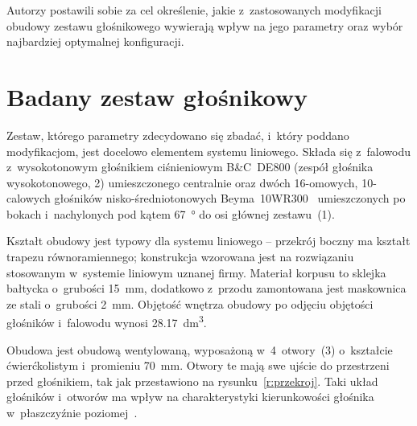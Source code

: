 \documentclass[12pt]{oska}
\newcommand{\comment}[1]{{\color{magenta}\emph{\textbf{#1}}}}
\begin{document}
	Autorzy postawili sobie za cel określenie, jakie z~zastosowanych modyfikacji obudowy zestawu głośnikowego wywierają wpływ na jego parametry oraz wybór najbardziej optymalnej konfiguracji.
	
	
	
	\section{Badany zestaw głośnikowy}\label{ss:opis}
	
	
	Zestaw, którego parametry zdecydowano się zbadać, i~który poddano modyfikacjom, jest docelowo elementem systemu liniowego. Składa się z~falowodu z~wysokotonowym głośnikiem ciśnieniowym B\&C~DE800 (zespół głośnika wysokotonowego, 2) umieszczonego centralnie oraz dwóch 16-omowych, 10-calowych głośników nisko-średniotonowych Beyma~10WR300~\cite{datasheet} umieszczonych po bokach i~nachylonych pod kątem \SI{67}{\degree} do osi głównej zestawu~(1).
	
	Kształt obudowy jest typowy dla systemu liniowego -- przekrój boczny ma kształt trapezu równoramiennego; konstrukcja wzorowana jest na rozwiązaniu stosowanym w~systemie liniowym uznanej firmy. Materiał korpusu to sklejka bałtycka o~grubości \SI{15}{\milli\metre}, dodatkowo z~przodu zamontowana jest maskownica ze stali o~grubości \SI{2}{\milli\metre}. Objętość wnętrza obudowy po odjęciu objętości głośników i~falowodu wynosi \SI{28,17}{\deci\metre\cubed}.
	
	Obudowa jest obudową wentylowaną, wyposażoną w~4~otwory~(3) o~kształcie ćwierćkolistym i~promieniu \SI{70}{\milli\metre}. Otwory te mają swe ujście do przestrzeni przed głośnikiem, tak jak przestawiono na rysunku~\ref{r:przekroj}. %
	Taki układ głośników i~otworów ma wpływ na charakterystyki kierunkowości głośnika w~płaszczyźnie poziomej~\cite{kmiecik_inz}. %
	
\end{document}
